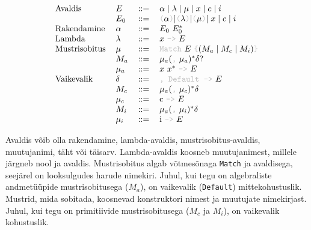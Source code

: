 \documentclass[12pt]{article}
\begin{document}
    \begin{equation*}
      \begin{tabular}{llll}
        Avaldis       & $E$       & $::=$ & $\alpha\mid\lambda\mid\mu\mid x\mid c\mid i$ \\
                      & $E_0$     & $::=$ & {\color{helehall}\verb!(!}$\alpha${\color{helehall}\verb!)!}$\mid${\color{helehall}\verb!(!}$\lambda${\color{helehall}\verb!)!}$\mid${\color{helehall}\verb!(!}$\mu${\color{helehall}\verb!)!}$\mid x\mid c\mid i$ \\
        Rakendamine   & $\alpha$  & $::=$ & $E_0$ $E_0^*$ \\
        Lambda        & $\lambda$ & $::=$ & $x$ {\color{helehall}\verb!->!} $E$ \\
        Mustrisobitus & $\mu$     & $::=$ & {\color{helehall}\verb!Match!} $E$ {\color{helehall}\verb!{!}$(M_a\mid M_c\mid M_i)${\color{helehall}\verb!}!} \\
                      & $M_a$     & $::=$ & $\mu_a(${\color{helehall}\verb!,!} $\mu_a)^*\delta?$ \\
                      & $\mu_a$   & $::=$ & $x$ $x^*$ {\color{helehall}\verb!->!} $E$ \\
        Vaikevalik    & $\delta$  & $::=$ & {\color{helehall}\verb!, Default ->!} $E$ \\
                      & $M_c$     & $::=$ & $\mu_a(${\color{helehall}\verb!,!} $\mu_c)^*\delta$ \\
                      & $\mu_c$   & $::=$ & c {\color{helehall}\verb!->!} $E$ \\
                      & $M_i$     & $::=$ & $\mu_a(${\color{helehall}\verb!,!} $\mu_i)^*\delta$ \\
                      & $\mu_i$   & $::=$ & i {\color{helehall}\verb!->!} $E$
      \end{tabular}
    \end{equation*}

    Avaldis võib olla rakendamine, lambda-avaldis, mustrisobitus-avaldis, muutujanimi, täht või täisarv. Lambda-avaldis koosneb muutujanimest, millele järgneb nool ja avaldis. Mustrisobitus algab võtmesõnaga \verb!Match! ja avaldisega, seejärel on looksulgudes harude nimekiri. Juhul, kui tegu on algebraliste andmetüüpide mustrisobitusega ($M_a$), on vaikevalik (\verb!Default!) mittekohustuslik. Mustrid, mida sobitada, koosnevad konstruktori nimest ja muutujate nimekirjast. Juhul, kui tegu on primitiivide mustrisobitusega ($M_c$ ja $M_i$), on vaikevalik kohustuslik.
\end{document}
